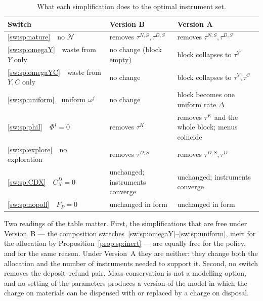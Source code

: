 \begin{table}[H]
\centering
\caption{What each simplification does to the optimal instrument set.}
\label{tab:mkt:switches}
\setlength{\tabcolsep}{5pt}
\renewcommand{\arraystretch}{1.05}
\begin{tabular}{@{}p{}p{}p{}@{}}
\toprule
Switch & Version B & Version A \\
\midrule
\ref{sw:sp:nature}\ \ no $\mathcal N$        & removes $\tau^{N,S},\tau^{D,S}$ & removes $\tau^{N,S},\tau^{D,S}$ \\
\ref{sw:sp:omegaY}\ \ waste from $Y$ only    & no change (block empty) & block collapses to $\tau^Y$ \\
\ref{sw:sp:omegaYC}\ \ waste from $Y,C$ only & no change & block collapses to $\tau^Y,\tau^C$ \\
\ref{sw:sp:uniform}\ \ uniform $\omega^j$    & no change & block becomes one uniform rate $\Delta$ \\
\ref{sw:sp:phiI}\ \ $\Phi^I=0$               & removes $\tau^K$ & removes $\tau^K$ and the whole block; menus coincide \\
\ref{sw:sp:explore}\ \ no exploration        & removes $\tau^{D,S}$ & removes $\tau^{D,S},\tau^D$ \\
\ref{sw:sp:CDX}\ \ $C^D_X=0$                 & unchanged; instruments converge & unchanged; instruments converge \\
\ref{sw:sp:nopoll}\ \ $F_P=0$                & unchanged in form & unchanged in form \\
\bottomrule
\end{tabular}
\end{table}

Two readings of the table matter. First, the simplifications that are free under Version~B --- the
composition switches~\ref{sw:sp:omegaY}--\ref{sw:sp:uniform}, inert for the allocation by
Proposition~\ref{prop:sp:inert} --- are equally free for the policy, and for the same reason. Under
Version~A they are neither: they change both the allocation and the number of instruments needed to
support it. Second, no switch removes the deposit--refund pair. Mass conservation is not a modelling
option, and no setting of the parameters produces a version of the model in which the charge on
materials can be dispensed with or replaced by a charge on disposal.

